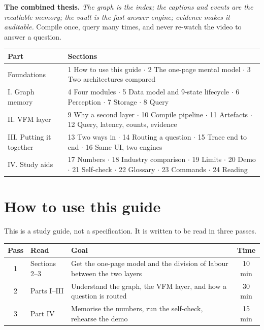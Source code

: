 \documentclass[10pt,a4paper]{article}
\newcommand{\panel}[1]{%
  \noindent\colorbox{panel}{%
    \begin{minipage}{\dimexpr\linewidth-2\fboxsep\relax}
    \vspace{2pt}#1\vspace{2pt}
    \end{minipage}}%
}
\begin{document}
\vspace{2pt}

\panel{
\textbf{The combined thesis.} \emph{The graph is the index; the captions and events are the
recallable memory; the vault is the fast answer engine; evidence makes it auditable.}
Compile once, query many times, and never re-watch the video to answer a question.
}

\vspace{2pt}

\noindent{\small\textbf{\textcolor{accent}{Contents at a glance}}}

\begin{center}
\small
\begin{tabularx}{\linewidth}{@{}l L@{}}
\toprule
\textbf{Part} & \textbf{Sections} \\
\midrule
Foundations & 1 How to use this guide \(\cdot\) 2 The one-page mental model \(\cdot\) 3 Two architectures compared \\
I. Graph memory & 4 Four modules \(\cdot\) 5 Data model and 9-state lifecycle \(\cdot\) 6 Perception \(\cdot\) 7 Storage \(\cdot\) 8 Query \\
II. VFM layer & 9 Why a second layer \(\cdot\) 10 Compile pipeline \(\cdot\) 11 Artefacts \(\cdot\) 12 Query, latency, counts, evidence \\
III. Putting it together & 13 Two ways in \(\cdot\) 14 Routing a question \(\cdot\) 15 Trace end to end \(\cdot\) 16 Same UI, two engines \\
IV. Study aids & 17 Numbers \(\cdot\) 18 Industry comparison \(\cdot\) 19 Limits \(\cdot\) 20 Demo \(\cdot\) 21 Self-check \(\cdot\) 22 Glossary \(\cdot\) 23 Commands \(\cdot\) 24 Reading \\
\bottomrule
\end{tabularx}
\end{center}

\section{How to use this guide}

This is a study guide, not a specification. It is written to be read in three passes.

\begin{center}
\small
\begin{tabularx}{\linewidth}{@{}c l L c@{}}
\toprule
\textbf{Pass} & \textbf{Read} & \textbf{Goal} & \textbf{Time} \\
 & Sections 2--3 & Get the one-page model and the division of labour between the two layers & 10 min \\
2 & Parts I--III & Understand the graph, the VFM layer, and how a question is routed & 30 min \\
3 & Part IV & Memorise the numbers, run the self-check, rehearse the demo & 15 min \\
\bottomrule
\end{tabularx}
\end{center}
\end{document}
